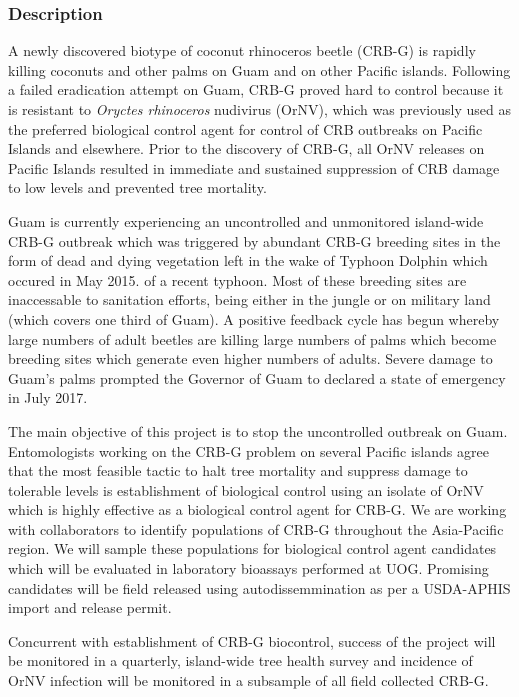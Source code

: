 \begin{refsection}
	
\subsubsection{Description}

A newly discovered biotype of coconut rhinoceros beetle (CRB-G) is
rapidly killing coconuts and other palms on Guam and on other Pacific
islands. Following a failed eradication attempt on Guam, CRB-G proved
hard to control because it is resistant to \emph{Oryctes rhinoceros}
nudivirus (OrNV), which was previously used as the preferred biological
control agent for control of CRB outbreaks on Pacific Islands and
elsewhere. Prior to the discovery of CRB-G, all OrNV releases on
Pacific Islands resulted in immediate and sustained suppression of
CRB damage to low levels and prevented tree mortality.

Guam is currently experiencing an uncontrolled and unmonitored island-wide
CRB-G outbreak which was triggered by abundant CRB-G breeding sites
in the form of dead and dying vegetation left in the wake of Typhoon
Dolphin which occured in May 2015. of a recent typhoon. Most of these
breeding sites are inaccessable to sanitation efforts, being either
in the jungle or on military land (which covers one third of Guam).
A positive feedback cycle has begun whereby large numbers of adult
beetles are killing large numbers of palms which become breeding sites
which generate even higher numbers of adults. Severe damage to Guam\textquoteright s
palms prompted the Governor of Guam to declared a state of emergency
in July 2017.

The main objective of this project is to stop the uncontrolled outbreak
on Guam. Entomologists working on the CRB-G problem on several Pacific
islands agree that the most feasible tactic to halt tree mortality
and suppress damage to tolerable levels is establishment of biological
control using an isolate of OrNV which is highly effective as a biological
control agent for CRB-G. We are working with collaborators to identify
populations of CRB-G throughout the Asia-Pacific region. We will sample
these populations for biological control agent candidates which will
be evaluated in laboratory bioassays performed at UOG. Promising candidates
will be field released using autodissemmination as per a USDA-APHIS
import and release permit.

Concurrent with establishment of CRB-G biocontrol, success of the
project will be monitored in a quarterly, island-wide tree health
survey and incidence of OrNV infection will be monitored in a subsample
of all field collected CRB-G.


\end{refsection}
